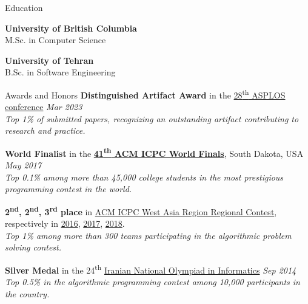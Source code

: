 \documentclass[
	10pt, %
]{resume} %
\begin{document}

\begin{rSection}{Education}
	
  \textbf{University of British Columbia} \\ %
	M.Sc. in Computer Science

  \textbf{University of Tehran} \\ %
  B.Sc. in Software Engineering
\end{rSection}


\begin{rSection}{Awards and Honors}
  {\bf Distinguished Artifact Award} in the
  \href{https://asplos-conference.org/asplos2023/index.html}{28\textsuperscript{th} ASPLOS conference} \hfill \textit{Mar 2023}
  \\ \textit{Top 1\% of submitted papers, recognizing an outstanding artifact contributing to research and practice.}


	\item {\bf World Finalist} in the
    \href{https://icpc.global/community/results-2017}{\textbf{41\textsuperscript{th} ACM ICPC World Finals}}, South Dakota, USA \hfill \textit{May 2017}
  \\ \textit{Top 0.1\% among more than 45,000 college students in the most prestigious programming contest in the world.}

	{\bf 2\textsuperscript{nd}, 2\textsuperscript{nd}, 3\textsuperscript{rd} place} in 
      \href{https://icpc.ir/}{ACM ICPC West Asia Region Regional Contest}, respectively in
      \href{http://icpc.sharif.edu/acmicpc16/scoreboard/}{2016},
      \href{http://icpc.sharif.edu/acmicpc17/scoreboard/}{2017},
      \href{http://icpc.sharif.edu/acmicpc18/scoreboard/}{2018}.
	\\ \textit{Top 1\% among more than 300 teams participating in the algorithmic
        problem solving contest.}

	{\bf Silver Medal} in the 24\textsuperscript{th} \href{http://inoi.ir/}
  {Iranian National Olympiad in Informatics} \hfill \textit{Sep 2014}
	\\ \textit{Top 0.5\% in the algorithmic programming contest among 10,000 participants in the country.}

\end{rSection}
\end{document}
